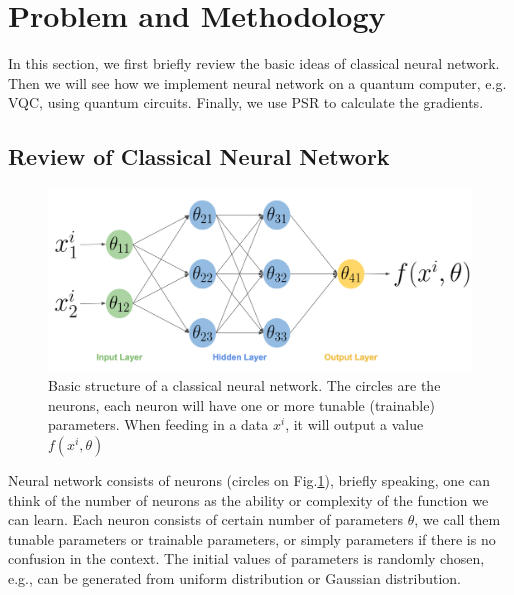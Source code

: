 \documentclass{article}
\begin{document}
\section{Problem and Methodology}
In this section, we first briefly review the basic ideas of classical neural network. Then we will see how we implement neural network on a quantum computer, e.g. VQC, using quantum circuits. Finally, we use PSR to calculate the gradients.

\subsection{Review of Classical Neural Network}
\begin{figure}
    \centering
    \includegraphics[scale=0.4]{dnn.png}
    \caption{Basic structure of a classical neural network. The circles are the neurons, each neuron will have one or more tunable (trainable) parameters. When feeding in a data $x^i$, it will output a value $f(x^i,\theta)$}
    \label{dnn}
\end{figure}
Neural network consists of neurons (circles on Fig.\ref{dnn}), briefly speaking, one can think of the number of neurons as the ability or complexity of the function we can learn. Each neuron consists of certain number of parameters $\theta$, we call them tunable parameters or trainable parameters, or simply parameters if there is no confusion in the context. The initial values of parameters is randomly chosen, e.g., can be generated from uniform distribution or Gaussian distribution.
\end{document}
